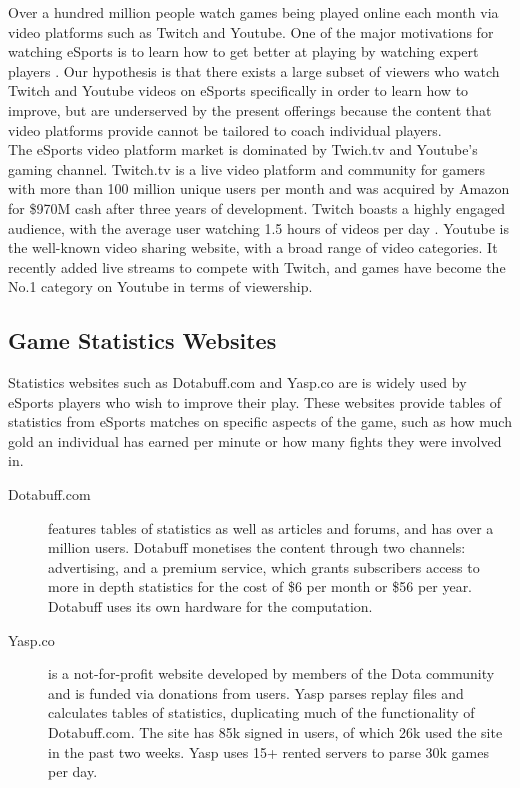 \documentclass[12pt]{article} %
\begin{document}
Over a hundred million people watch games being played online each month via video platforms such as Twitch and Youtube. One of the major motivations for watching eSports is to learn how to get better at playing by watching expert players \cite{Hamari15}. Our hypothesis is that there exists a large subset of viewers who watch Twitch and Youtube videos on eSports specifically in order to learn how to improve, but are underserved by the present offerings because the content that video platforms provide cannot be tailored to coach individual players.\\
 
The eSports video platform market is dominated by Twich.tv and Youtube's gaming channel. Twitch.tv is a live video platform and community for gamers with more than 100 million unique users per month and was acquired by Amazon for \$970M cash after three years of development. Twitch boasts a highly engaged audience, with the average user watching 1.5 hours of videos per day \cite{Dredge}. Youtube is the well-known video sharing website, with a broad range of video categories. It recently added live streams to compete with Twitch, and games have become the No.1 category on Youtube in terms of viewership.
 
\subsection{Game Statistics Websites}
 
Statistics websites such as Dotabuff.com and Yasp.co are is widely used by eSports players who wish to improve their play. These websites provide tables of statistics from eSports matches on specific aspects of the game, such as how much gold an individual has earned per minute or how many fights they were involved in.

\begin{description}
    \item [Dotabuff.com] features tables of statistics as well as articles and forums, and has over a million users. Dotabuff monetises the content through two channels: advertising, and a premium service, which grants subscribers access to more in depth statistics for the cost of \$6 per month or \$56 per year. Dotabuff uses its own hardware for the computation.
 
    \item [Yasp.co] is a not-for-profit website developed by members of the Dota community and is funded via donations from users. Yasp parses replay files and calculates tables of statistics, duplicating much of the functionality of Dotabuff.com. The site has 85k signed in users, of which 26k used the site in the past two weeks. Yasp uses 15+ rented servers to parse 30k games per day.
\end{description}
\end{document}
